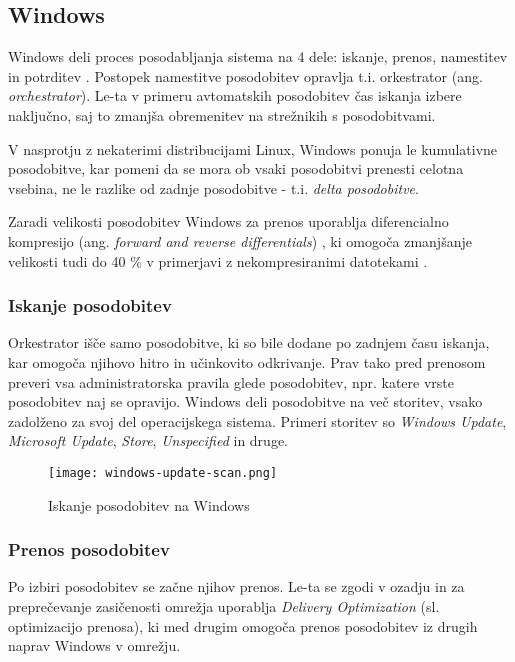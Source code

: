 \subsection{Windows}

Windows deli proces posodabljanja sistema na 4 dele: iskanje, prenos, namestitev in potrditev \cite{windows-update}.
Postopek namestitve posodobitev opravlja t.i. orkestrator (ang. \emph{orchestrator}).
Le-ta v primeru avtomatskih posodobitev čas iskanja izbere naključno, saj to zmanjša obremenitev na strežnikih s
posodobitvami.

V nasprotju z nekaterimi distribucijami Linux, Windows ponuja le kumulativne posodobitve, kar pomeni da se mora ob vsaki
posodobitvi prenesti celotna vsebina, ne le razlike od zadnje posodobitve - t.i. \emph{delta posodobitve}.

Zaradi velikosti posodobitev Windows za prenos uporablja diferencialno kompresijo
(ang. \emph{forward and reverse differentials}) \cite{windows-update-compression}, ki omogoča zmanjšanje velikosti
tudi do 40 \% v primerjavi z nekompresiranimi datotekami \cite{windows-update-compression-2}.

\subsubsection{Iskanje posodobitev}

Orkestrator išče samo posodobitve, ki so bile dodane po zadnjem času iskanja, kar omogoča njihovo hitro
in učinkovito odkrivanje.
Prav tako pred prenosom preveri vsa administratorska pravila glede posodobitev, npr. katere vrste posodobitev
naj se opravijo.
Windows deli posodobitve na več storitev, vsako zadolženo za svoj del operacijskega sistema.
Primeri storitev so \emph{Windows Update}, \emph{Microsoft Update}, \emph{Store}, \emph{Unspecified} in druge.

\begin{figure}[H]
    \centering
    \texttt{[image: windows-update-scan.png]}
    \caption{Iskanje posodobitev na Windows \cite{windows-update}}
\end{figure}

\subsubsection{Prenos posodobitev}

Po izbiri posodobitev se začne njihov prenos. Le-ta se zgodi v ozadju in za preprečevanje zasičenosti omrežja
uporablja \emph{Delivery Optimization} (sl. optimizacijo prenosa), ki med drugim omogoča prenos posodobitev iz
drugih naprav Windows v omrežju.

